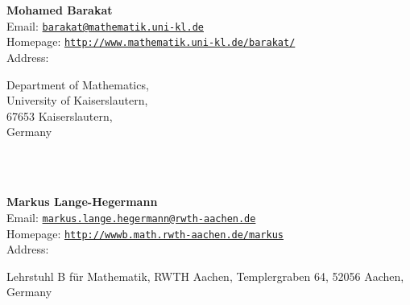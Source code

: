 \documentclass[a4paper,11pt]{report}
\begin{document}
\begin{titlepage}
\mbox{}\\
{\mbox{}\\
\small \noindent \textbf{Mohamed Barakat\\
    }  Email: \href{mailto://barakat@mathematik.uni-kl.de} {\texttt{barakat@mathematik.uni-kl.de}}\\
  Homepage: \href{http://www.mathematik.uni-kl.de/~barakat/} {\texttt{http://www.mathematik.uni-kl.de/\texttt{}barakat/}}\\
  Address: \begin{minipage}[t]{8cm}\noindent
 Department of Mathematics, \\
 University of Kaiserslautern, \\
 67653 Kaiserslautern, \\
 Germany \end{minipage}
}\\
{\mbox{}\\
\small \noindent \textbf{Markus Lange-Hegermann\\
    }  Email: \href{mailto://markus.lange.hegermann@rwth-aachen.de} {\texttt{markus.lange.hegermann@rwth-aachen.de}}\\
  Homepage: \href{http://wwwb.math.rwth-aachen.de/~markus} {\texttt{http://wwwb.math.rwth-aachen.de/\texttt{}markus}}\\
  Address: \begin{minipage}[t]{8cm}\noindent
 Lehrstuhl B f{\"u}r Mathematik, RWTH Aachen, Templergraben 64, 52056 Aachen,
Germany \end{minipage}
}\\
\end{titlepage}
\end{document}
